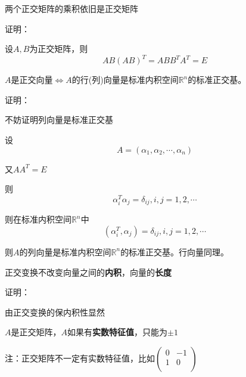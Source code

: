 \documentclass[lang=cn,10pt]{elegantbook}
\begin{document}
\begin{conclusion}
	两个正交矩阵的乘积依旧是正交矩阵
\end{conclusion}

证明：

设$A,B$为正交矩阵，则
\begin{equation*}
	AB(AB)^{T}=ABB^{T}A^{T}=E
\end{equation*}

\begin{conclusion}
		$A$是正交向量$\Longleftrightarrow A$的行(列)向量是标准内积空间$\mathbb{R} ^n$的标准正交基。
\end{conclusion}

证明：

不妨证明列向量是标准正交基

设
\begin{equation*}
	A=(\alpha_{1},\alpha_{2},\cdots,\alpha_{n})
\end{equation*}

又$AA^{T}=E$

则
\begin{equation*}
	\alpha_{i}^{T}\alpha_{j}=\delta _{ij},i,j=1,2,\cdots
\end{equation*}

则在标准内积空间$\mathbb{R} ^n$中
\begin{equation*}
	(\alpha_{i}^{T},\alpha_{j})=\delta _{ij},i,j=1,2,\cdots
\end{equation*}

则$A$的列向量是标准内积空间$\mathbb{R} ^n$的标准正交基。行向量同理。

\begin{conclusion}
	正交变换不改变向量之间的\textbf{内积}，向量的\textbf{长度}
\end{conclusion}

证明：

由正交变换的保内积性显然

\begin{conclusion}
	$A$是正交矩阵，$A$如果有\textbf{实数特征值}，只能为$\pm1$
	
	注：正交矩阵不一定有实数特征值，比如$
	\left( \begin{matrix}
		0&		-1\\
		1&		0\\
	\end{matrix} \right) 
	$
\end{conclusion}
\end{document}
